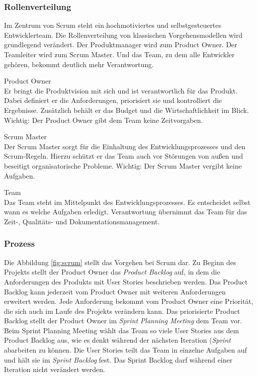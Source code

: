 \subsubsection{Rollenverteilung}
Im Zentrum von Scrum steht ein hochmotiviertes und selbstgesteuertes Entwicklerteam. Die Rollenverteilung von klassischen Vorgehensmodellen wird grundlegend verändert. Der Produktmanager wird zum Product Owner. Der Teamleiter wird zum Scrum Master. Und das Team, zu dem alle Entwickler gehören, bekommt deutlich mehr Verantwortung.

\begin{description}
\item Product Owner\\
Er bringt die Produktvision mit sich und ist verantwortlich für das Produkt. Dabei definiert er die Anforderungen, priorisiert sie und kontrolliert die Ergebnisse. Zusätzlich behält er das Budget und die Wirtschaftlichkeit im Blick. Wichtig: Der Product Owner gibt dem Team keine Zeitvorgaben.

\item Scrum Master\\
Der Scrum Master sorgt für die Einhaltung des Entwicklungsprozesses und den Scrum-Regeln. Hierzu schützt er das Team auch vor Störungen von außen und beseitigt organisatorische Probleme. Wichtig: Der Scrum Master vergibt keine Aufgaben.

\item Team\\
Das Team steht im Mittelpunkt des Entwicklungsprozesses. Es entscheidet selbst wann es welche Aufgaben erledigt. Verantwortung übernimmt das Team für das Zeit-, Qualitäts- und Dokumentationsmanagement.
\end{description}

\subsubsection{Prozess}
Die Abbildung \ref{fig:scrum} stellt das Vorgehen bei Scrum dar. Zu Beginn des Projekts stellt der Product Owner das \emph{Product Backlog} auf, in dem die Anforderungen des Produkts mit User Stories beschrieben werden. Das Product Backlog kann jederzeit vom Product Owner mit weiteren Anforderungen erweitert werden. Jede Anforderung bekommt vom Product Owner eine Priorität, die sich auch im Laufe des Projekts verändern kann. Das priorisierte Product Backlog stellt der Product Owner im \emph{Sprint Planning Meeting} dem Team vor. Beim Sprint Planning Meeting wählt das Team so viele User Stories aus dem Product Backlog aus, wie es denkt während der nächsten Iteration (\emph{Sprint} abarbeiten zu können. Die User Stories teilt das Team in einzelne Aufgaben auf und hält sie im \emph{Sprint Backlog} fest. Das Sprint Backlog darf während einer Iteration nicht verändert werden.

